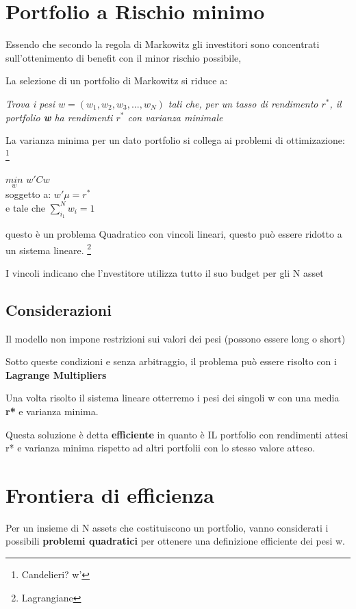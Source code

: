 \documentclass[a4paper,11pt]{report}
\begin{document}
{%
\section{Portfolio a Rischio minimo}
	Essendo che secondo la regola di Markowitz gli investitori sono concentrati sull'ottenimento di benefit con il minor rischio 			possibile,

	La selezione di un portfolio di Markowitz si riduce a:
\begin{center}
	\emph{ Trova i pesi  $w=(w_1,w_2,w_3,...,w_N)$ tali che, per un tasso di rendimento $r^*$, il portfolio \textbf{w} ha rendimenti 		$r^*$  con varianza minimale }
\end{center}
	La varianza minima per un dato portfolio si collega ai problemi di ottimizazione: \footnote{Candelieri? w'}
\begin{center}
	$ \underset{w}{min}$ $ w' Cw $ \\
	soggetto a: $ w' \mu = r^* $ \\
 	e tale che $ \sum\limits_{i_1}^{N} w_i=1 $
\end{center}
	questo è un problema Quadratico con vincoli lineari, questo può essere ridotto a un sistema lineare. \footnote{Lagrangiane}

	I vincoli indicano che l'nvestitore utilizza tutto il suo budget per gli N asset
\subsection{Considerazioni}
	Il modello non impone restrizioni sui valori dei pesi (possono essere long o short)

	Sotto queste condizioni e senza arbitraggio, il problema può essere risolto con i \textbf{Lagrange Multipliers}

	Una volta risolto il sistema lineare otterremo i pesi dei singoli w con una media \textbf{r*} e varianza minima.

	Questa soluzione è detta \textbf{efficiente} in quanto è IL portfolio con rendimenti attesi r* e varianza minima rispetto ad altri 			portfolii con lo stesso valore atteso.
\section{Frontiera di efficienza}
	Per un insieme di N assets che costituiscono un portfolio, vanno considerati i possibili \textbf{problemi quadratici} per 			ottenere
	una definizione efficiente dei pesi w. \newline

}
\end{document}
